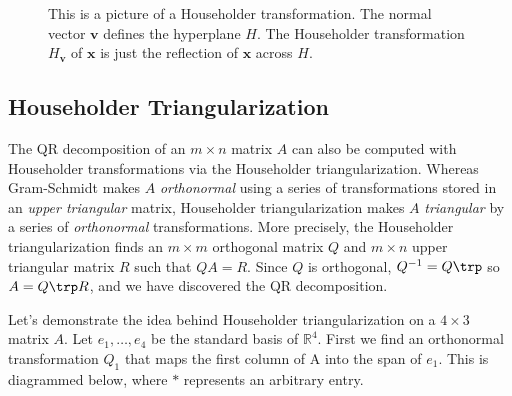 \begin{figure}[H]
\begin{center}
\end{center}
\caption{This is a picture of a Householder transformation.
The normal vector $\mathbf{v}$ defines the hyperplane $H$.
The Householder transformation $H_{\mathbf{v}}$ of $\mathbf{x}$ is just the reflection of $\mathbf{x}$ across $H$.}
\label{fig:Householder_reflector}
\end{figure}

\subsection*{Householder Triangularization} %

The QR decomposition of an $m \times n$ matrix $A$ can also be computed with Householder transformations via the Householder triangularization.
Whereas Gram-Schmidt makes $A$ \emph{orthonormal} using a series of transformations stored in an \emph{upper triangular} matrix, Householder triangularization makes $A$ \emph{triangular} by a series of \emph{orthonormal} transformations.
More precisely, the Householder triangularization finds an $m \times m$ orthogonal matrix $Q$ and $m \times n$ upper triangular matrix $R$ such that $QA = R$.
Since $Q$ is orthogonal, $Q^{-1}=Q\trp$ so $A = Q\trp R$, and we have discovered the QR decomposition.

Let's demonstrate the idea behind Householder triangularization on a $4 \times 3$ matrix $A$.
Let $e_1, \ldots, e_4$ be the standard basis of $\mathbb{R}^4$.
First we find an orthonormal transformation $Q_1$ that maps the first column of A into the span of $e_1$.
This is diagrammed below, where $*$ represents an arbitrary entry.

